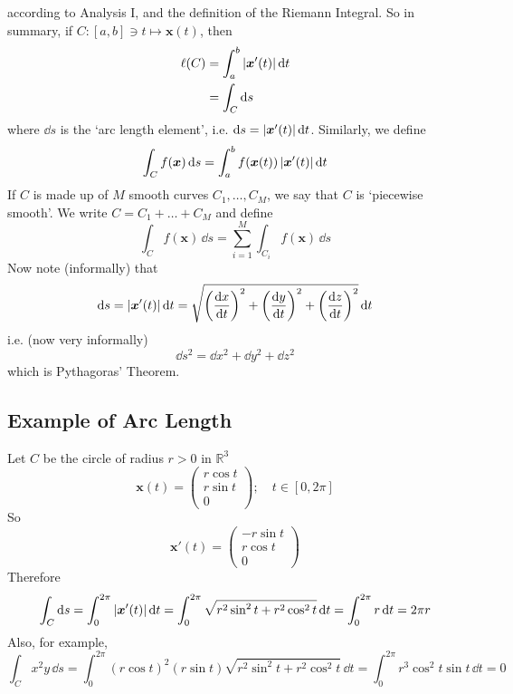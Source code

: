 \documentclass{article}
\begin{document}
according to Analysis I, and the definition of the Riemann Integral. So in summary, if $C \colon [a, b] \ni t \mapsto \bm x(t)$, then
\begin{align*}
    \ell(C) & = \int_a^b \abs{\bm x'(t)} \,\dd t \\
            & = \int_C \dd s
\end{align*}
where $\dd s$ is the `arc length element', i.e. $\dd s = \abs{\bm x'(t)} \,\dd t$. Similarly, we define
\[ \int_C f(\bm x) \,\dd s = \int_a^b f(\bm x(t)) \,\abs{\bm x'(t)} \,\dd t \]
If $C$ is made up of $M$ smooth curves $C_1, \dots, C_M$, we say that $C$ is `piecewise smooth'. We write $C = C_1 + \dots + C_M$ and define
\[ \int_C f(\bm x) \,\dd s = \sum_{i=1}^M \int_{C_i}f(\bm x) \,\dd s \]
Now note (informally) that
\[ \dd s = \abs{\bm x'(t)}\,\dd t = \sqrt{\left( \frac{\dd x}{\dd t} \right)^2 + \left( \frac{\dd y}{\dd t} \right)^2 + \left( \frac{\dd z}{\dd t} \right)^2} \,\dd t \]
i.e. (now very informally)
\[ \dd s^2 = \dd x^2 + \dd y^2 + \dd z^2 \]
which is Pythagoras' Theorem.

\subsection{Example of Arc Length}
Let $C$ be the circle of radius $r>0$ in $\mathbb R^3$
\[ \bm x(t) = \begin{pmatrix}
        r\cos t \\ r\sin t \\ 0
    \end{pmatrix};\quad t \in [0, 2\pi] \]
So
\[ \bm x'(t) = \begin{pmatrix}
        -r\sin t \\ r\cos t \\ 0
    \end{pmatrix} \]
Therefore
\[ \int_C \dd s = \int_0^{2\pi} \abs{\bm x'(t)} \,\dd t = \int_0^{2\pi} \sqrt{r^2 \sin^2 t + r^2 \cos^2 t} \,\dd t = \int_0^{2\pi} r \,\dd t = 2\pi r \]
Also, for example,
\[ \int_C x^2 y \,\dd s = \int_0^{2\pi} (r \cos t)^2 (r \sin t) \sqrt{r^2 \sin^2 t + r^2 \cos^2 t} \,\dd t = \int_0^{2\pi} r^3 \cos^2 t \sin t \,\dd t = 0 \]
\end{document}
